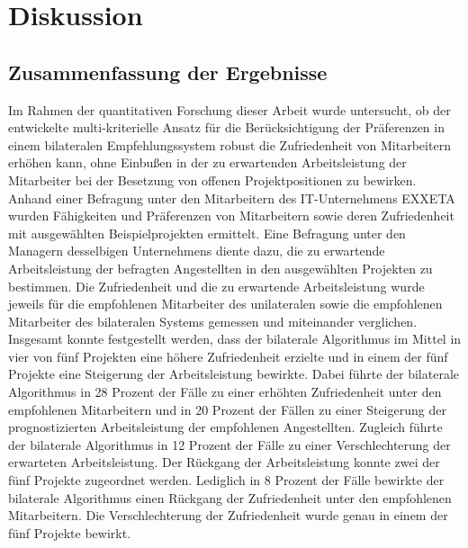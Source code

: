 
\chapter{Diskussion}
\label{ch:diskussion}

\section{Zusammenfassung der Ergebnisse}
Im Rahmen der quantitativen Forschung dieser Arbeit wurde untersucht, ob der entwickelte multi-kriterielle Ansatz für die Berücksichtigung der Präferenzen in einem bilateralen Empfehlungssystem robust die Zufriedenheit von Mitarbeitern erhöhen kann, ohne Einbußen in der zu erwartenden Arbeitsleistung der Mitarbeiter bei der Besetzung von offenen Projektpositionen zu bewirken.
Anhand einer Befragung unter den Mitarbeitern des IT-Unternehmens EXXETA wurden Fähigkeiten und Präferenzen von Mitarbeitern sowie deren Zufriedenheit mit ausgewählten Beispielprojekten ermittelt.
Eine Befragung unter den Managern desselbigen Unternehmens diente dazu, die zu erwartende Arbeitsleistung der befragten Angestellten in den ausgewählten Projekten zu bestimmen.
Die Zufriedenheit und die zu erwartende Arbeitsleistung wurde jeweils für die empfohlenen Mitarbeiter des unilateralen sowie die empfohlenen Mitarbeiter des bilateralen Systems gemessen und miteinander verglichen.
Insgesamt konnte festgestellt werden, dass der bilaterale Algorithmus im Mittel in vier von fünf Projekten eine höhere Zufriedenheit erzielte und in einem der fünf Projekte eine Steigerung der Arbeitsleistung bewirkte.
Dabei führte der bilaterale Algorithmus in 28 Prozent der Fälle zu einer erhöhten Zufriedenheit unter den empfohlenen Mitarbeitern und in 20 Prozent der Fällen zu einer Steigerung der prognostizierten Arbeitsleistung der empfohlenen Angestellten.
Zugleich führte der bilaterale Algorithmus in 12 Prozent der Fälle zu einer Verschlechterung der erwarteten Arbeitsleistung.
Der Rückgang der Arbeitsleistung konnte zwei der fünf Projekte zugeordnet werden.
Lediglich in 8 Prozent der Fälle bewirkte der bilaterale Algorithmus einen Rückgang der Zufriedenheit unter den empfohlenen Mitarbeitern.
Die Verschlechterung der Zufriedenheit wurde genau in einem der fünf Projekte bewirkt.

